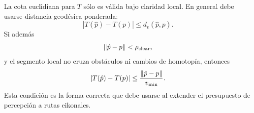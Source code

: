 La cota euclidiana para $T$ sólo es válida bajo claridad local. En general debe usarse
distancia geodésica ponderada:
\begin{equation}
  |T(\hat p)-T(p)|\le d_v(\hat p,p).
  \label{eq:anexo_cota_geodesica}
\end{equation}
Si además
\begin{equation}
  \left\|\hat p-p\right\|<\rho_{\mathrm{clear}},
  \label{eq:anexo_condicion_claridad}
\end{equation}
y el segmento local no cruza obstáculos ni cambios de homotopía, entonces
\begin{equation}
  |T(\hat p)-T(p)|
  \le
  \frac{\left\|\hat p-p\right\|}{v_{\min}}.
  \label{eq:anexo_cota_euclidiana_claridad}
\end{equation}
Esta condición es la forma correcta que debe usarse al extender el presupuesto de
percepción a rutas eikonales.
